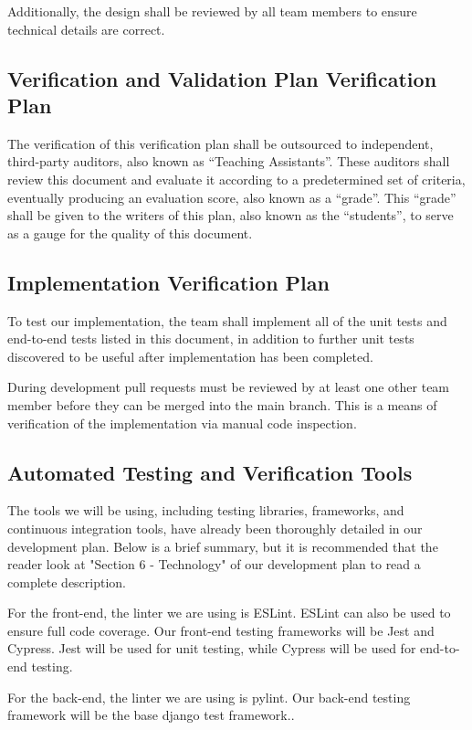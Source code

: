 \documentclass[12pt, titlepage]{article}
\begin{document}
Additionally, the design shall be reviewed by all team members to ensure technical details are correct.

\subsection{Verification and Validation Plan Verification Plan}

The verification of this verification plan shall be outsourced to independent, third-party auditors, also known as ``Teaching Assistants''. These auditors shall review this document and evaluate it according to a predetermined set of criteria, eventually producing an evaluation score, also known as a ``grade''. This ``grade'' shall be given to the writers of this plan, also known as the ``students'', to serve as a gauge for the quality of this document.

\subsection{Implementation Verification Plan}

To test our implementation, the team shall implement all of the unit tests and end-to-end tests listed in this document, in addition to further unit tests discovered to be useful after implementation has been completed.

During development pull requests must be reviewed by at least one other team member before they can be merged into the main branch. This is a means of verification of the implementation via manual code inspection.

\subsection{Automated Testing and Verification Tools}

The tools we will be using, including testing libraries, frameworks, and continuous integration tools, have already been thoroughly detailed in our development plan. Below is a brief summary, but it is recommended that the reader look at "Section 6 - Technology" of our development plan to read a complete description.

For the front-end, the linter we are using is ESLint. ESLint can also be used to ensure full code coverage. Our front-end testing frameworks will be Jest and Cypress. Jest will be used for unit testing, while Cypress will be used for end-to-end testing.

For the back-end, the linter we are using is pylint. Our back-end testing framework will be the base django test framework..
\end{document}
